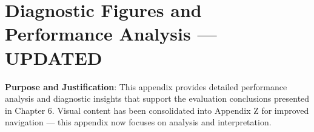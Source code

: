 \chapter{Diagnostic Figures and Performance Analysis — UPDATED}

\textbf{Purpose and Justification}: This appendix provides detailed performance analysis and diagnostic insights that support the evaluation conclusions presented in Chapter 6. Visual content has been consolidated into Appendix Z for improved navigation — this appendix now focuses on analysis and interpretation.


